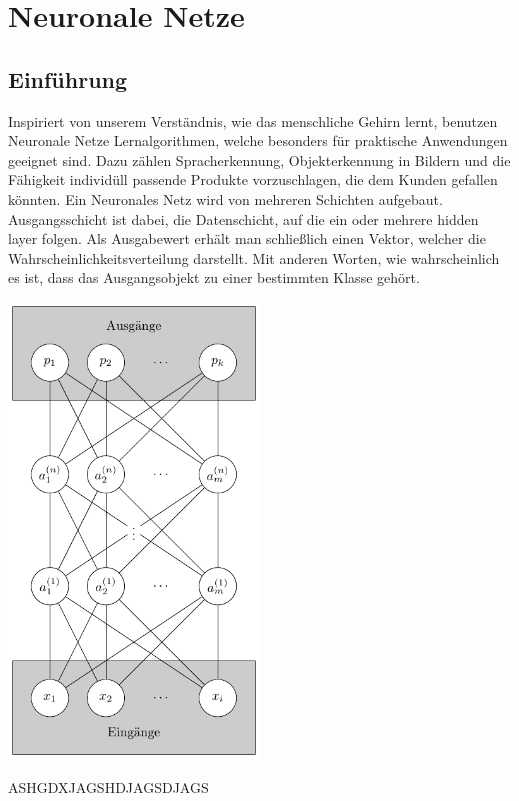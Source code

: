 \section{Neuronale Netze}


\subsection{Einführung}

Inspiriert von unserem Verständnis, wie das menschliche Gehirn lernt, benutzen Neuronale Netze Lernalgorithmen, welche besonders für praktische Anwendungen geeignet sind.
Dazu zählen Spracherkennung, Objekterkennung in Bildern und die Fähigkeit individüll passende Produkte vorzuschlagen, die dem Kunden gefallen könnten. 
Ein Neuronales Netz wird von mehreren Schichten aufgebaut. Ausgangsschicht ist dabei, die Datenschicht, auf die ein oder mehrere hidden layer folgen. Als Ausgabewert erhält man schließlich einen Vektor, welcher die Wahrscheinlichkeitsverteilung darstellt. Mit anderen Worten, wie wahrscheinlich es ist, dass das Ausgangsobjekt zu einer bestimmten Klasse gehört.

\begin{dsafigure}
\begin{center}
	\includegraphics[width=0.5\textwidth]{Figure_NN}
	\caption{ASHGDXJAGSHDJAGSDJAGS}
	\label{NN1}
	\end{center}
\end{dsafigure}

